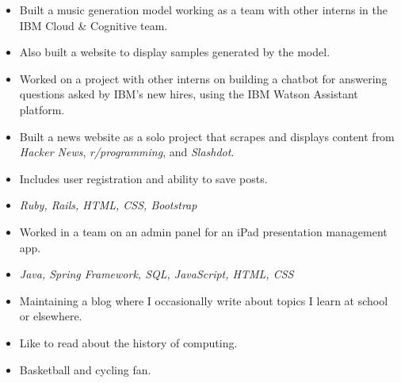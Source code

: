 


\begin{itemize}
	\item Built a music generation model working as a team with other interns in the IBM Cloud \& Cognitive team.
	\item Also built a website to display samples generated by the model. 
\end{itemize}

\begin{itemize}
	\item Worked on a project with other interns on building a chatbot for answering questions asked by IBM's new hires, using the IBM Watson Assistant platform. 
\end{itemize}

\begin{itemize}
	\item Built a news website as a solo project that scrapes and displays content from \textit{Hacker News}, \textit{r/programming}, and \textit{Slashdot}.
	\item Includes user registration and ability to save posts.
	\item \textit{Ruby, Rails, HTML, CSS, Bootstrap}
\end{itemize}

\begin{itemize}
    \item Worked in a team on an admin panel for an iPad presentation management app.
    \item \textit{Java, Spring Framework, SQL, JavaScript, HTML, CSS}
\end{itemize}

\begin{itemize}
\item Maintaining a blog where I occasionally write about topics I learn at school or elsewhere.
\item Like to read about the history of computing.
\item Basketball and cycling fan.
\end{itemize}
    

